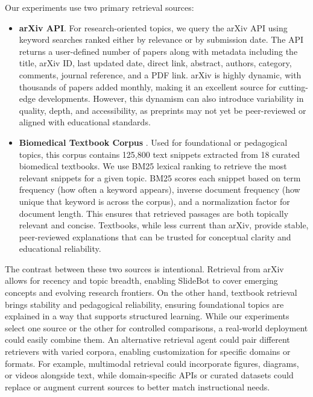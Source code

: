 \documentclass[letterpaper]{article} %
\begin{document}
Our experiments use two primary retrieval sources:

\begin{itemize}
    \item \textbf{arXiv API}. For research-oriented topics, we query the arXiv API using keyword searches ranked either by relevance or by submission date. The API returns a user-defined number of papers along with metadata including the title, arXiv ID, last updated date, direct link, abstract, authors, category, comments, journal reference, and a PDF link. arXiv is highly dynamic, with thousands of papers added monthly, making it an excellent source for cutting-edge developments. However, this dynamism can also introduce variability in quality, depth, and accessibility, as preprints may not yet be peer-reviewed or aligned with educational standards.
    \item \textbf{Biomedical Textbook Corpus} \citep{jin2021disease}. Used for foundational or pedagogical topics, this corpus contains 125,800 text snippets extracted from 18 curated biomedical textbooks. We use BM25 lexical ranking to retrieve the most relevant snippets for a given topic. BM25 scores each snippet based on term frequency (how often a keyword appears), inverse document frequency (how unique that keyword is across the corpus), and a normalization factor for document length. This ensures that retrieved passages are both topically relevant and concise. Textbooks, while less current than arXiv, provide stable, peer-reviewed explanations that can be trusted for conceptual clarity and educational reliability.
\end{itemize}



The contrast between these two sources is intentional. Retrieval from arXiv allows for recency and topic breadth, enabling SlideBot to cover emerging concepts and evolving research frontiers. On the other hand, textbook retrieval brings stability and pedagogical reliability, ensuring foundational topics are explained in a way that supports structured learning. While our experiments select one source or the other for controlled comparisons, a real-world deployment could easily combine them. An alternative retrieval agent could pair different retrievers with varied corpora, enabling customization for specific domains or formats. For example, multimodal retrieval could incorporate figures, diagrams, or videos alongside text, while domain-specific APIs or curated datasets could replace or augment current sources to better match instructional needs.
\end{document}
